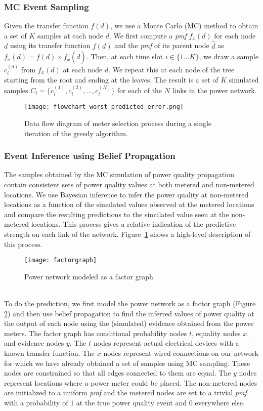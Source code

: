 \subsubsection{MC Event Sampling}
Given the transfer function $f(d)$, we use a Monte Carlo (MC) method to obtain a set of $K$ samples at each node $d$. We first compute a \emph{pmf} $f_x{(d)}$ for each node $d$ using its transfer function $f(d)$ and the \emph{pmf} of its parent node $\widehat{d}$ as $f_x(d) = f(d) \times f_x(\widehat{d})$. Then, at each time slot $i \in \{1\ldots K\}$, we draw a sample $c_{i}^{(d)}$ from $f_x(d)$ at each node $d$. We repeat this at each node of the tree starting from the root and ending at the leaves. The result is a set of $K$ simulated samples $C_{i}=\{c_{i}^{(1)},c_{i}^{(2)},\ldots,c_{i}^{(N)}\}$ for each of the $N$ links in the power network.

\begin{figure}[t]
\centering
\texttt{[image: flowchart\_worst\_predicted\_error.png]}
\caption{Data flow diagram of meter selection process during a single iteration of the greedy algorithm.}
\label{flowchart}
\end{figure}

\subsubsection{Event Inference using Belief Propagation}
The samples obtained by the MC simulation of power quality propagation contain consistent sets of power quality values at both metered and non-metered locations. We use Bayesian inference to infer the power quality at non-metered locations as a function of the  simulated values observed at the metered locations and compare the resulting predictions to the simulated value seen at the non-metered locations. This process gives a relative indication of the predictive strength on each link of the network. Figure~\ref{flowchart} shows a high-level description of this process.

\begin{figure}[!t]
\centering
\texttt{[image: factorgraph]}
\caption{Power network modeled as a factor graph}
\label{factorgraph}
\end{figure}

\noindent \\
To do the prediction, we first model the power network as a factor graph (Figure \ref{factorgraph}) and then use belief propagation to find the inferred values of power quality at the output of each node using the (simulated) evidence obtained from the power meters. The factor graph has conditional probability nodes $t$, equality nodes $x$, and evidence nodes $y$. The $t$ nodes represent actual electrical devices with a known transfer function. The $x$ nodes represent wired connections on our network for which we have already obtained a set of samples using MC sampling. These nodes are constrained so that all edges connected to them are equal. The $y$ nodes represent locations where a power meter could be placed. The non-metered nodes are initialized to a uniform \emph{pmf} and the metered nodes are set to a trivial \emph{pmf} with a probability of $1$ at the true power quality event and $0$ everywhere else. 

